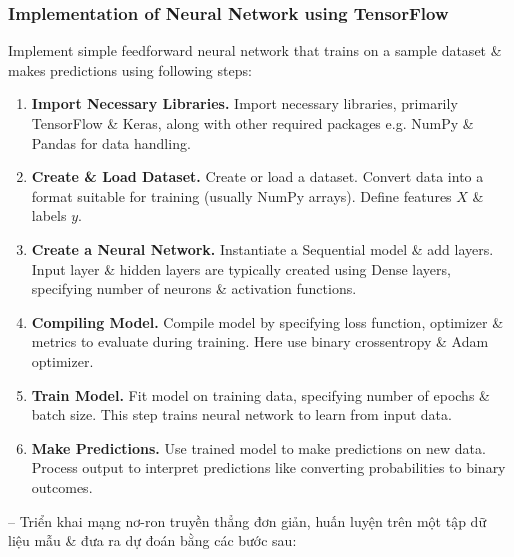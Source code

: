 \documentclass{article}
\begin{document}

\subsubsection{Implementation of Neural Network using TensorFlow}
Implement simple feedforward neural network that trains on a sample dataset \& makes predictions using following steps:
\begin{enumerate}
    \item {\bf Import Necessary Libraries.} Import necessary libraries, primarily TensorFlow \& Keras, along with other required packages e.g. NumPy \& Pandas for data handling.
    \item {\bf Create \& Load Dataset.} Create or load a dataset. Convert data into a format suitable for training (usually NumPy arrays). Define features $X$ \& labels $y$.
    \item {\bf Create a Neural Network.} Instantiate a Sequential model \& add layers. Input layer \& hidden layers are typically created using Dense layers, specifying number of neurons \& activation functions.
    \item {\bf Compiling Model.} Compile model by specifying loss function, optimizer \& metrics to evaluate during training. Here use binary crossentropy \& Adam optimizer.
    \item {\bf Train Model.} Fit model on training data, specifying number of epochs \& batch size. This step trains neural network to learn from input data.
    \item {\bf Make Predictions.} Use trained model to make predictions on new data. Process output to interpret predictions like converting probabilities to binary outcomes.
\end{enumerate}
-- Triển khai mạng nơ-ron truyền thẳng đơn giản, huấn luyện trên một tập dữ liệu mẫu \& đưa ra dự đoán bằng các bước sau:
\end{document}
